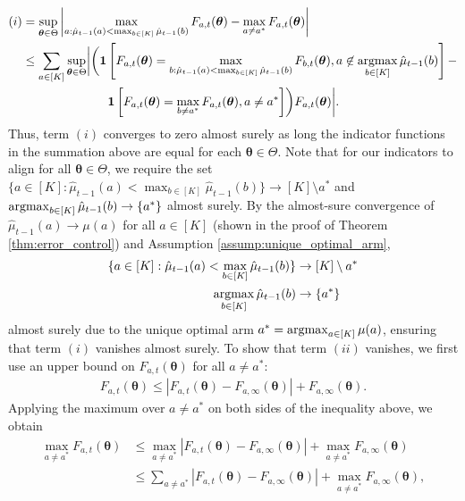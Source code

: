 \documentclass{article}
\begin{document}
\begin{appendices}
\begin{align}
    (i) &= \sup_{\bm\theta \in \Theta}\left| \max_{a: \hat\mu_{t-1}(a) < \max_{b \in [K]} \hat\mu_{t-1}(b)} F_{a, t}(\bm{\theta})-\max_{a \neq a^*} F_{a, t}(\bm{\theta}) \right| \\
    &\leq \sum_{a \in [K]}\sup_{\bm\theta \in \Theta}\biggr| \biggr(\mathbf{1}\left[F_{a,t }(\bm\theta)= \max_{b: \hat\mu_{t-1}(a)<\max_{b \in [K]}\hat\mu_{t-1}(b)} F_{b, t}(\bm{\theta}), a \not\in \argmax_{b \in [K]}\hat\mu_{t-1}(b) \right]-\\
&\quad\quad\quad\quad\quad\quad\quad  \mathbf{1}\left[F_{a, t}(\bm\theta) = \max_{b \neq a^*} F_{a, t}(\bm\theta), a \neq a^*\right]\biggr) F_{a, t}(\bm\theta) \biggr|.
\end{align}
Thus, term $(i)$ converges to zero almost surely as long the indicator functions in the summation above are equal for each $\bm\theta \in \Theta$. Note that for our indicators to align for all $\bm\theta \in \Theta$, we require the set $\{a \in [K]: \hat\mu_{t-1}(a) < \max_{b \in [K]} \hat\mu_{t-1}(b)\} \rightarrow [K]\setminus a^*$ and $\argmax_{b \in [K]}\hat\mu_{t-1}(b) \rightarrow \{a^*\}$ almost surely. By the almost-sure convergence of $\hat\mu_{t-1}(a) \rightarrow \mu(a)$ for all $a \in [K]$ (shown in the proof of Theorem \ref{thm:error_control}) and Assumption \ref{assump:unique_optimal_arm},  
\begin{align}
    \{a \in [K]: \hat\mu_{t-1}(a) < \max_{b \in [K]} \hat\mu_{t-1}(b)\} &\rightarrow [K]\setminus a^* \\
    \argmax_{b \in [K]}\hat\mu_{t-1}(b) &\rightarrow \{a^*\}
\end{align}
almost surely due to the unique optimal arm $a^* = \argmax_{a \in [K]} \mu(a)$, ensuring that term $(i)$ vanishes almost surely. To show that term $(ii)$ vanishes, we first use an upper bound on $F_{a,t}(\bm\theta)$ for all $a \neq a^*$:
\begin{align}
    F_{a,t}(\bm\theta) \leq  |F_{a, t}(\bm{\theta}) - F_{a,\infty}(\bm{\theta})| + F_{a, \infty}(\bm\theta).
\end{align}
Applying the maximum over $a \neq a^*$ on both sides of the inequality above, we obtain
\begin{align}
    \max_{a \neq a^*} F_{a,t}(\bm\theta) &\leq \max_{a \neq a^*}|F_{a, t}(\bm{\theta}) - F_{a,\infty}(\bm{\theta})| + \max_{a \neq a^*}F_{a, \infty}(\bm\theta)\\
    &\leq \sum_{a \neq a^*}|F_{a, t}(\bm{\theta}) - F_{a,\infty}(\bm{\theta})| + \max_{a \neq a^*}F_{a, \infty}(\bm\theta),

\end{align}
\end{appendices}
\end{document}
